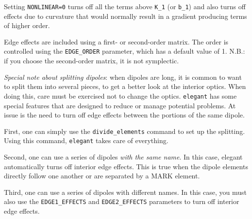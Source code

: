 Setting {\tt NONLINEAR=0} turns off all the terms above {\tt K\_1} (or {\tt b\_1}) and
also turns off effects due to curvature that would
normally result in a gradient producing terms of higher order.

Edge effects are included using a first- or second-order matrix.  The
order is controlled using the {\tt EDGE\_ORDER} parameter, which has a
default value of 1.  N.B.: if you choose the second-order matrix, it
is not symplectic.

{\em Special note about splitting dipoles}: when dipoles are long, it is
common to want to split them into several pieces, to get a better look
at the interior optics.  When doing this, care must be exercised not
to change the optics.  {\tt elegant} has some special features that
are designed to reduce or manage potential problems. At issue is the
need to turn off edge effects between the portions of the same dipole.

First, one can simply use the \verb|divide_elements| command to set up
the splitting.  Using this command, {\tt elegant} takes care of everything.

Second, one can use a series of dipoles {\em with the same name}.  In this case,
elegant automatically turns off interior edge effects.  This is true when the
dipole elements directly follow one another or are separated by a MARK element.

Third, one can use a series of dipoles with different names.  In this case, you
must also use the \verb|EDGE1_EFFECTS| and \verb|EDGE2_EFFECTS| parameters to
turn off interior edge effects.  
